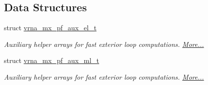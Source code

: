 \subsection*{Data Structures}
\begin{DoxyCompactItemize}
\item 
struct \hyperlink{group__loops_structvrna__mx__pf__aux__el__t}{vrna\+\_\+mx\+\_\+pf\+\_\+aux\+\_\+el\+\_\+t}
\begin{DoxyCompactList}\small\item\em Auxiliary helper arrays for fast exterior loop computations.  \hyperlink{group__loops_structvrna__mx__pf__aux__el__t}{More...}\end{DoxyCompactList}\item 
struct \hyperlink{group__loops_structvrna__mx__pf__aux__ml__t}{vrna\+\_\+mx\+\_\+pf\+\_\+aux\+\_\+ml\+\_\+t}
\begin{DoxyCompactList}\small\item\em Auxiliary helper arrays for fast exterior loop computations.  \hyperlink{group__loops_structvrna__mx__pf__aux__ml__t}{More...}\end{DoxyCompactList}\end{DoxyCompactItemize}
